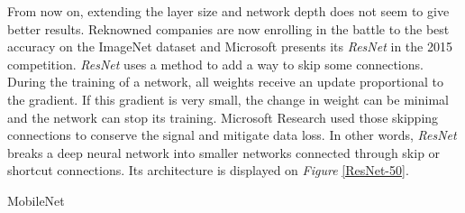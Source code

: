 From now on, extending the layer size and network depth does not seem to give better results. Reknowned companies are now enrolling in the battle to the best accuracy on the ImageNet dataset \cite{ImageNet2009} and Microsoft presents its \emph{ResNet} \cite{He2015} in the 2015 competition. \emph{ResNet} uses a method to add a way to skip some connections. During the training of a network, all weights receive an update proportional to the gradient. If this gradient is very small, the change in weight can be minimal and the network can stop its training. Microsoft Research used those skipping connections to conserve the signal and mitigate data loss. In other words, \emph{ResNet} breaks a deep neural network into smaller networks connected through skip or shortcut connections. Its architecture is displayed on \emph{Figure} \ref{ResNet-50}.


MobileNet \cite{Howard2017}




